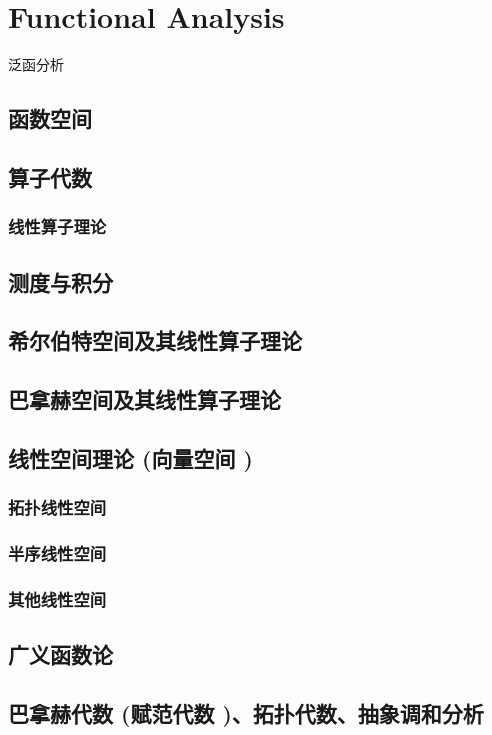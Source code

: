 \documentclass[UTF8]{../09-Mathematics}
\begin{document}
\chapter{Functional Analysis}

泛函分析


\section{函数空间}
\section{算子代数}
    \subsection{线性算子理论}

\section{测度与积分}


\section{希尔伯特空间及其线性算子理论}
\section{巴拿赫空间及其线性算子理论}
\section{线性空间理论 (向量空间 )}
    \subsection{拓扑线性空间}
    \subsection{半序线性空间}
    \subsection{其他线性空间}

\section{广义函数论}
\section{巴拿赫代数 (赋范代数 )、拓扑代数、抽象调和分析}
\end{document}
